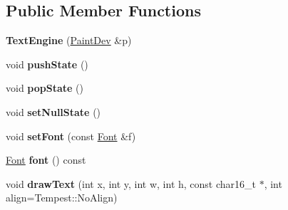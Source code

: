 \subsection*{Public Member Functions}
\begin{DoxyCompactItemize}
\item 
\hypertarget{struct_tempest_1_1_surface_render_1_1_text_engine_a1d653567822c23f5437b02f2f3249693}{{\bfseries Text\+Engine} (\hyperlink{struct_tempest_1_1_surface_render_1_1_paint_dev}{Paint\+Dev} \&p)}\label{struct_tempest_1_1_surface_render_1_1_text_engine_a1d653567822c23f5437b02f2f3249693}

\item 
\hypertarget{struct_tempest_1_1_surface_render_1_1_text_engine_af8087eb0242e426f90691116daf0c89b}{void {\bfseries push\+State} ()}\label{struct_tempest_1_1_surface_render_1_1_text_engine_af8087eb0242e426f90691116daf0c89b}

\item 
\hypertarget{struct_tempest_1_1_surface_render_1_1_text_engine_acffd140b6e0e5b5a4dc2c6a75b5a52f9}{void {\bfseries pop\+State} ()}\label{struct_tempest_1_1_surface_render_1_1_text_engine_acffd140b6e0e5b5a4dc2c6a75b5a52f9}

\item 
\hypertarget{struct_tempest_1_1_surface_render_1_1_text_engine_a3e71db7686f97d7f0d01161fcb968701}{void {\bfseries set\+Null\+State} ()}\label{struct_tempest_1_1_surface_render_1_1_text_engine_a3e71db7686f97d7f0d01161fcb968701}

\item 
\hypertarget{struct_tempest_1_1_surface_render_1_1_text_engine_a37692cb456bce83a3c4f426a525cfa8f}{void {\bfseries set\+Font} (const \hyperlink{class_tempest_1_1_font}{Font} \&f)}\label{struct_tempest_1_1_surface_render_1_1_text_engine_a37692cb456bce83a3c4f426a525cfa8f}

\item 
\hypertarget{struct_tempest_1_1_surface_render_1_1_text_engine_aaaedf611c88de0ec727d23b9a75f92f9}{\hyperlink{class_tempest_1_1_font}{Font} {\bfseries font} () const }\label{struct_tempest_1_1_surface_render_1_1_text_engine_aaaedf611c88de0ec727d23b9a75f92f9}

\item 
\hypertarget{struct_tempest_1_1_surface_render_1_1_text_engine_a81a97a900a668008429b1a80bb554a4a}{void {\bfseries draw\+Text} (int x, int y, int w, int h, const char16\+\_\+t $\ast$, int align=Tempest\+::\+No\+Align)}\label{struct_tempest_1_1_surface_render_1_1_text_engine_a81a97a900a668008429b1a80bb554a4a}


\end{DoxyCompactItemize}
